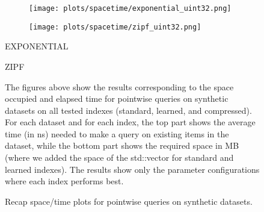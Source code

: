 \documentclass{article}
\begin{document}
\begin{figure}[!htbp]
{\begin{minipage}[t][0.98\textheight][t]{\textwidth}
    \begin{minipage}{0.48\linewidth}
        \begin{figure}[H]
        \texttt{[image: plots/spacetime/exponential\_uint32.png]}
        \end{figure}
    \end{minipage}
    \begin{minipage}{0.48\linewidth}
        \begin{figure}[H]
        \texttt{[image: plots/spacetime/zipf\_uint32.png]}
        \end{figure}
    \end{minipage}
    \begin{minipage}{0.48\linewidth}
    \begin{center}
        EXPONENTIAL
    \end{center}
    \end{minipage}
    \begin{minipage}{0.48\linewidth}
    \begin{center}
        ZIPF
    \end{center}
    \end{minipage}

    \vspace{20px}
    
    \begin{minipage}{\linewidth}
        The figures above show the results corresponding to the space occupied and elapsed time for pointwise queries on synthetic datasets on all tested indexes (standard, learned, and compressed). For each dataset and for each index, the top part shows the average time (in ns) needed to make a query on existing items in the dataset, while the bottom part shows the required space in MB (where we added the space of the std::vector for standard and learned indexes).  
    The results show only the parameter configurations where each index performs best. 
            \end{minipage}
    \vspace{20px}
\end{minipage}
}
\caption{Recap space/time plots for pointwise queries on synthetic datasets.}
\end{figure}
\end{document}
